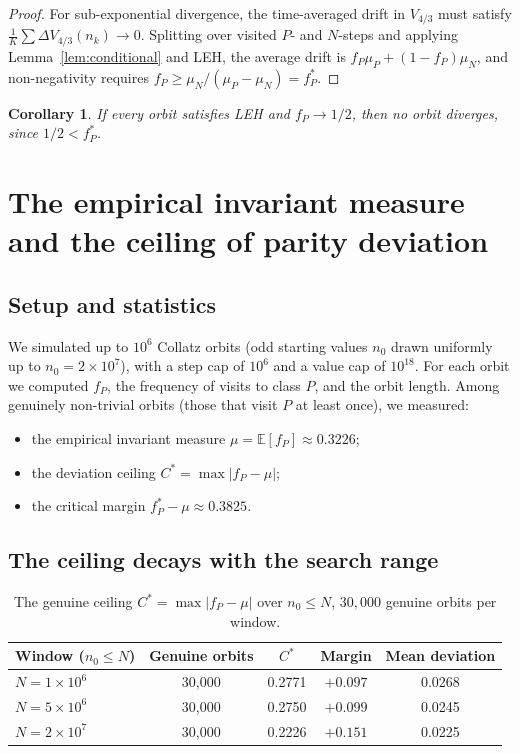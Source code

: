 \documentclass[12pt,reqno]{amsart}
\theoremstyle{plain}
\newtheorem{corollary}[theorem]{Corollary}
\theoremstyle{definition}
\newcommand{\E}{\mathbb{E}}
\newcommand{\fP}{f_P}
\newcommand{\fPstar}{f_P^*}
\newcommand{\muP}{\mu_P}
\newcommand{\muN}{\mu_N}
\newcommand{\Vmetric}{V_{4/3}}
\begin{document}
\begin{proof}
For sub-exponential divergence, the time-averaged drift in $\Vmetric$ must satisfy
$\frac{1}{K}\sum \Delta \Vmetric(n_k) \to 0$. Splitting over visited $P$- and
$N$-steps and applying Lemma~\ref{lem:conditional} and LEH, the average drift
is $ \fP \muP + (1 - \fP) \muN$, and non-negativity requires
$\fP \geq \muN/(\muP - \muN) = \fPstar$. \qedhere
\end{proof}

\begin{corollary}\label{cor:halbcurve}
If every orbit satisfies LEH and $\fP \to 1/2$, then no orbit diverges, since
$1/2 < \fPstar$.
\end{corollary}

\section{The empirical invariant measure and the ceiling of parity deviation}

\subsection{Setup and statistics}

We simulated up to $10^6$ Collatz orbits (odd starting values $n_0$ drawn
uniformly up to $n_0 = 2\times10^7$), with a step cap of $10^6$ and a value cap
of $10^{18}$. For each orbit we computed $\fP$, the frequency of visits to
class $P$, and the orbit length. Among genuinely non-trivial orbits (those that
visit $P$ at least once), we measured:

\begin{itemize}
\item the empirical invariant measure $\mu = \E[\fP] \approx 0.3226$;
\item the deviation ceiling $C^* = \max |\fP - \mu|$;
\item the critical margin $\fPstar - \mu \approx 0.3825$.
\end{itemize}

\subsection{The ceiling decays with the search range}

\begin{table}[h]
\centering
\caption{The genuine ceiling $C^* = \max|\fP - \mu|$ over $n_0 \le N$, $30{,}000$
genuine orbits per window.}
\begin{tabular}{lcccc}
\toprule
Window ($n_0 \le N$) & Genuine orbits & $C^*$ & Margin & Mean deviation \\
\midrule
$N = 1\times10^6$ & 30{,}000 & 0.2771 & $+0.097$ & 0.0268 \\
$N = 5\times10^6$ & 30{,}000 & 0.2750 & $+0.099$ & 0.0245 \\
$N = 2\times10^7$ & 30{,}000 & 0.2226 & $+0.151$ & 0.0225 \\
\bottomrule
\end{tabular}
\end{table}
\end{document}
